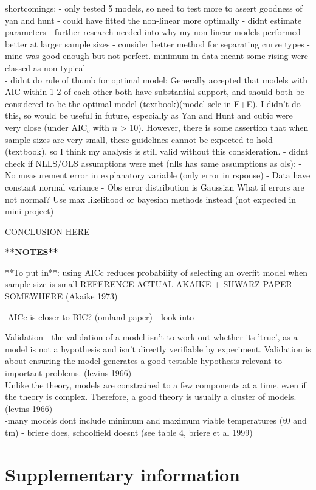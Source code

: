 \documentclass[11pt, a4paper]{article}
\begin{document}
shortcomings:
- only tested 5 models, so need to test more to assert goodness of yan and hunt
- could have fitted the non-linear more optimally
- didnt estimate parameters
- further research needed into why my non-linear models performed better at larger sample sizes
- consider better method for separating curve types - mine was good enough but not perfect. minimum in data meant some rising were classed as non-typical
\\ - didnt do rule of thumb for optimal model: Generally accepted that models with AIC within 1-2 of each other both have substantial support, and should both be considered to be the optimal model (textbook)(model sele in E+E). I didn't do this, so would be useful in future, especially as Yan and Hunt and cubic were very close (under AIC$_c$ with $n$ > 10). However, there is some assertion that when sample sizes are very small, these guidelines cannot be expected to hold (textbook), so I think my analysis is still valid without this consideration.
- didnt check if NLLS/OLS assumptions were met (nlls has same assumptions as ols): 		- No measurement error in explanatory variable (only error in rsponse)
		- Data have constant normal variance
		- Obs error distribution is Gaussian
What if errors are not normal? Use max likelihood or bayesian methods instead (not expected in mini project)

CONCLUSION HERE

\textbf{**NOTES**}

**To put in**: using AICc reduces probability of selecting an overfit model when sample size is small
REFERENCE ACTUAL AKAIKE + SHWARZ PAPER SOMEWHERE (Akaike 1973)

-AICc is closer to BIC? (omland paper) - look into

Validation - the validation of a model isn't to work out whether its 'true', as a model is not a hypothesis and isn't directly verifiable by experiment. Validation is about ensuring the model generates a good testable hypothesis relevant to important problems. (levins 1966)
\\
Unlike the theory, models are constrained to a few components at a time, even if the theory is complex. Therefore, a good theory is usually a cluster of models. (levins 1966)
\\
-many models dont include minimum and maximum viable temperatures (t0 and tm) - briere does, schoolfield doesnt (see table 4, briere et al 1999)




\newpage
\section{Supplementary information}
\end{document}
